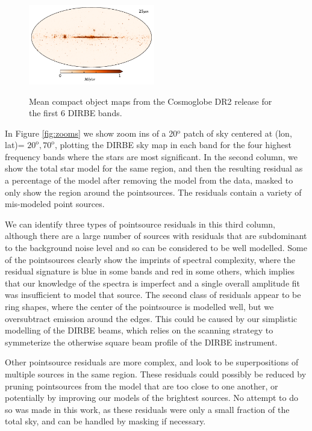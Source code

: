 \documentclass{aa}
\begin{document}
\begin{figure}
  \includegraphics[width=0.49\textwidth]{figs/starmaps/all_stars_mean_06.pdf} \\
  \caption{Mean compact object maps from the Cosmoglobe DR2 release for the first 6 DIRBE bands. }
  \label{fig:starsT}
\end{figure}

In Figure \ref{fig:zooms} we show zoom ins of a 20$^\mathrm{o}$ patch of sky centered at (lon, lat)= $20^\mathrm{o}, 70^\mathrm{o}$, plotting the DIRBE sky map in each band for the four highest frequency bands where the stars are most significant. In the second column, we show the total star model for the same region, and then the resulting residual as a percentage of the model after removing the model from the data, masked to only show the region around the pointsources. The residuals contain a variety of mis-modeled point sources.

We can identify three types of pointsource residuals in this third column, although there are a large number of sources with residuals that are subdominant to the background noise level and so can be considered to be well modelled. Some of the pointsources clearly show the imprints of spectral complexity, where the residual signature is blue in some bands and red in some others, which implies that our knowledge of the spectra is imperfect and a single overall amplitude fit was insufficient to model that source. The second class of residuals appear to be ring shapes, where the center of the pointsource is modelled well, but we oversubtract emission around the edges. This could be caused by our simplistic modelling of the DIRBE beams, which relies on the scanning strategy to symmeterize the otherwise square beam profile of the DIRBE instrument.

Other pointsource residuals are more complex, and look to be superpositions of multiple sources in the same region. These residuals could possibly be reduced by pruning pointsources from the model that are too close to one another, or potentially by improving our models of the brightest sources. No attempt to do so was made in this work, as these residuals were only a small fraction of the total sky, and can be handled by masking if necessary.
\end{document}
